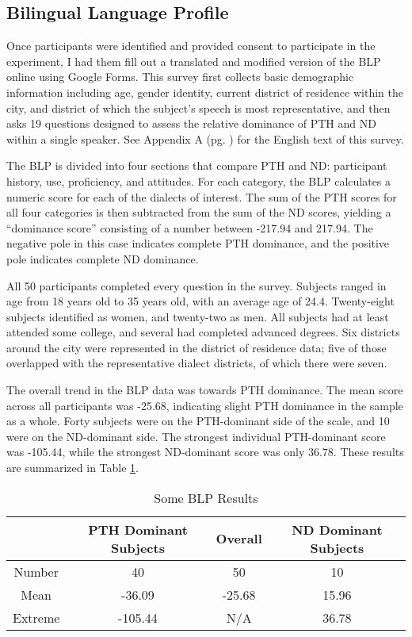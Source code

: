 \subsection{Bilingual Language Profile}
\label{ssec:procedureBLP}
Once participants were identified and provided consent to participate in the experiment, I had them fill out a translated and modified version of the BLP online using Google Forms. This survey first collects basic demographic information including age, gender identity, current district of residence within the city, and district of which the subject’s speech is most representative, and then asks 19 questions designed to assess the relative dominance of PTH and ND within a single speaker. See Appendix A (pg. \pageref{appendix:BLP}) for the English text of this survey.

The BLP is divided into four sections that compare PTH and ND: participant history, use, proficiency, and attitudes. For each category, the BLP calculates a numeric score for each of the dialects of interest. The sum of the PTH scores for all four categories is then subtracted from the sum of the ND scores, yielding a “dominance score” consisting of a number between -217.94 and 217.94. The negative pole in this case indicates complete PTH dominance, and the positive pole indicates complete ND dominance.

All 50 participants completed every question in the survey. Subjects ranged in age from 18 years old to 35 years old, with an average age of 24.4. Twenty-eight subjects identified as women, and twenty-two as men. All subjects had at least attended some college, and several had completed advanced degrees. Six districts around the city were represented in the district of residence data; five of those overlapped with the representative dialect districts, of which there were seven.

The overall trend in the BLP data was towards PTH dominance. The mean score across all participants was -25.68, indicating slight PTH dominance in the sample as a whole. Forty subjects were on the PTH-dominant side of the scale, and 10 were on the ND-dominant side. The strongest individual PTH-dominant score was -105.44, while the strongest ND-dominant score was only 36.78. These results are summarized in Table \ref{table:BLPResults}.

\begin{table}
\centering
\begin{tabular}{|c||c|c|c|}
 \hline
  & PTH Dominant Subjects & Overall & ND Dominant Subjects \\ [0.5ex] 
 \hline\hline
 Number & 40 & 50 & 10 \\ 
 \hline
 Mean & -36.09 & -25.68 & 15.96 \\
 \hline
 Extreme & -105.44 & N/A & 36.78 \\
 \hline
\end{tabular}
\caption{Some BLP Results}
\label{table:BLPResults}
\end{table}

